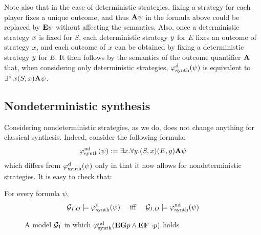 Note also that in the case of deterministic strategies, fixing a
strategy for each player fixes a unique outcome, and thus ${\bf A}\psi$ in
the formula above could be replaced by ${\bf E}\psi$ without affecting the semantics.
Also, once a deterministic strategy $x$ is fixed for $S$, each
deterministic strategy $y$ for $E$ fixes an outcome of strategy $x$, and each outcome
of $x$ can be obtained by fixing a deterministic strategy $y$
for $E$. It then follows by the
semantics of the outcome quantifier ${\bf A}$ that, when
considering only deterministic strategies,
$\varphi^{\text{d}}_{\text{synth}}(\psi)$ is equivalent to $\operatorname*{\exists^{\hskip.5pt\text{d}}} x (S,x){\bf A}\psi$.

\subsection{Nondeterministic synthesis}
\label{sec-nd-synth}

Considering nondeterministic strategies, as we do, does not change
anything for classical \LTL synthesis. Indeed, consider the following
formula:
\[\varphi^{\text{nd}}_{\text{synth}}(\psi):=\exists x.   \forall y.
 (S,x)(E,y) {\bf A} \psi\]
which differs from $\varphi^{\text{d}}_{\text{synth}}(\psi)$ only in that it now allows for
 nondeterministic strategies. It is easy to check that:
\begin{proposition}
  \label{prop-equiv-synth}
  For every \LTL formula $\psi$, \[\CGS_{I,O}\models
  \phisynthdet(\psi) \quad\mbox{ iff } \quad\CGS_{I,O}\models \phisynthndet(\psi)\]
\end{proposition}

\begin{figure}
  \centering
{}  
  \caption{A model $\CGS_1$ in which $\varphi^{\text{nd}}_{\text{synth}}({\bf E} {\bf G} p
  \wedge {\bf E} {\bf F} \neg p)$ holds}
  \label{fig:example}
\end{figure}

